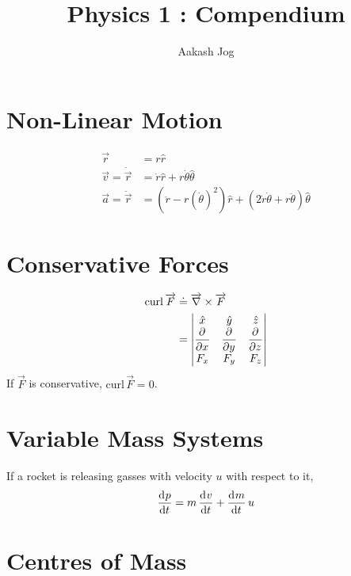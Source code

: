 \documentclass[fleqn, a5paper]{amsart}
\title{Physics 1 : Compendium}
\author{Aakash Jog}
\theoremstyle{definition}
\theoremstyle{theorem}
\newcommand{\curl}{\mathrm{curl\,}}
\begin{document}
\maketitle

\section{Non-Linear Motion}

\begin{align*}
	\overrightarrow{r} &= r \hat{r} \\
	\overrightarrow{v} = \dot{\overrightarrow{r}} &= \dot{r} \hat{r} + r \dot{\theta} \hat{\theta} \\
	\overrightarrow{a} = \ddot{\overrightarrow{r}} &= \left(\ddot{r} - r(\dot{\theta})^2\right) \hat{r} + \left(2 \dot{r} \dot{\theta} + r \ddot{\theta}\right) \hat{\theta}
\end{align*}

\section{Conservative Forces}
	\begin{align*}
		\curl \overrightarrow{F} &\doteq \overrightarrow{\nabla} \times \overrightarrow{F} \\
		&=
			\begin{vmatrix} 
				\hat{x} & \hat{y} & \hat{z} \\
				\dpd{}{x} & \dpd{}{y} & \dpd{}{z} \\
				F_x & F_y & F_z \\
			\end{vmatrix}
	\end{align*}
	If $\overrightarrow{F}$ is conservative, $\curl \overrightarrow{F} = 0$.

\section{Variable Mass Systems}

If a rocket is releasing gasses with velocity $u$ with respect to it,
\begin{equation*}
\dod{p}{t} = m \dod{v}{t} + \dod{m}{t} u
\end{equation*}

\section{Centres of Mass}
\end{document}
